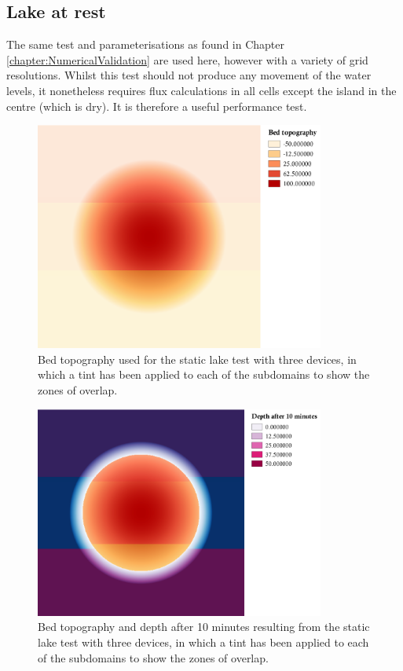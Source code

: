\subsection{Lake at rest}

The same test and parameterisations as found in Chapter \ref{chapter:NumericalValidation} are used here, however with a variety of grid resolutions. Whilst this test should not produce any movement of the water levels, it nonetheless requires flux calculations in all cells except the island in the centre (which is dry). It is therefore a useful performance test.

\begin{figure}[p]
	\centering
	\includegraphics[width=0.85\textwidth]{decomposition-test-figures/static-lake-topography.png}
	\caption{Bed topography used for the static lake test with three devices, in which a tint has been applied to each of the subdomains to show the zones of overlap.}
	\label{TestResult_WellBalanced_Decomposed_Domains}
\end{figure}
\begin{figure}[p]
	\centering
	\includegraphics[width=0.85\textwidth]{decomposition-test-figures/static-lake-depth.png}
	\caption{Bed topography and depth after 10 minutes resulting from the static lake test with three devices, in which a tint has been applied to each of the subdomains to show the zones of overlap.}
	\label{TestResult_WellBalanced_Decomposed_Depth}
\end{figure}
